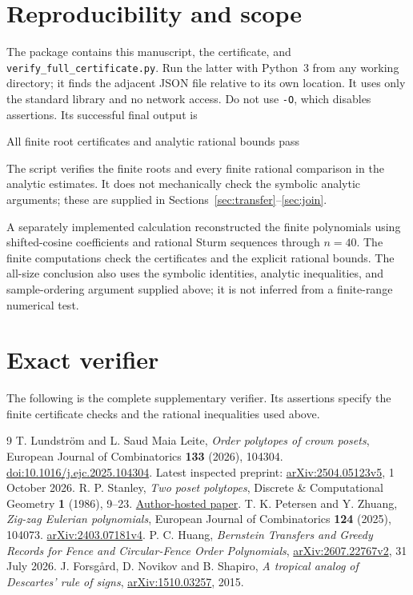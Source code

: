 \documentclass[11pt,letterpaper]{article}
\numberwithin{equation}{section}
\begin{document}
\section{Reproducibility and scope}
The package contains this manuscript, the certificate, and \texttt{verify\_full\_certificate.py}. Run the latter with Python~3 from any working directory; it finds the adjacent JSON file relative to its own location. It uses only the standard library and no network access. Do not use \texttt{-O}, which disables assertions. Its successful final output is
\begin{center}\small\ttfamily
 All finite root certificates and analytic rational bounds pass
\end{center}
The script verifies the finite roots and every finite rational comparison in the analytic estimates. It does not mechanically check the symbolic analytic arguments; these are supplied in Sections~\ref{sec:transfer}--\ref{sec:join}.

A separately implemented calculation reconstructed the finite polynomials using shifted-cosine coefficients and rational Sturm sequences through $n=40$. The finite computations check the certificates and the explicit rational bounds. The all-size conclusion also uses the symbolic identities, analytic inequalities, and sample-ordering argument supplied above; it is not inferred from a finite-range numerical test.

\clearpage
\appendix
\section{Exact verifier}\label{app:verifier}
The following is the complete supplementary verifier. Its assertions specify the finite certificate checks and the rational inequalities used above.

\begin{thebibliography}{9}
\small\setlength{\itemsep}{2pt}
T. Lundstr\"om and L. Saud Maia Leite,
\emph{Order polytopes of crown posets}, European Journal of Combinatorics \textbf{133} (2026), 104304.
\href{https://doi.org/10.1016/j.ejc.2025.104304}{doi:10.1016/j.ejc.2025.104304}.
Latest inspected preprint: \href{https://arxiv.org/abs/2504.05123v5}{arXiv:2504.05123v5}, 1 October 2026.
R. P. Stanley, \emph{Two poset polytopes}, Discrete \& Computational Geometry \textbf{1} (1986), 9--23.
\href{https://math.mit.edu/~rstan/pubs/pubfiles/66.pdf}{Author-hosted paper}.
T. K. Petersen and Y. Zhuang, \emph{Zig-zag Eulerian polynomials}, European Journal of Combinatorics \textbf{124} (2025), 104073.
\href{https://arxiv.org/abs/2403.07181v4}{arXiv:2403.07181v4}.
P. C. Huang, \emph{Bernstein Transfers and Greedy Records for Fence and Circular-Fence Order Polynomials},
\href{https://arxiv.org/abs/2607.22767v2}{arXiv:2607.22767v2}, 31 July 2026.
J. Forsg{\aa}rd, D. Novikov and B. Shapiro,
\emph{A tropical analog of Descartes' rule of signs},
\href{https://arxiv.org/abs/1510.03257}{arXiv:1510.03257}, 2015.
\end{thebibliography}
\end{document}
